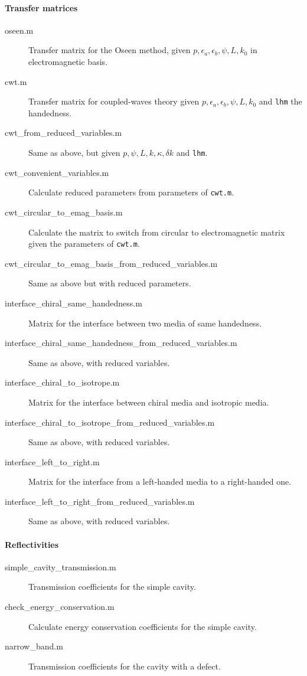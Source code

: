 \paragraph{Transfer matrices}

\begin{description}
	\item[oseen.m] Transfer matrix for the Oseen method, given $p, \epsilon_a, \epsilon_b, \psi, L, k_0$ in electromagnetic basis.
	\item[cwt.m] Transfer matrix for coupled-waves theory given $p, \epsilon_a, \epsilon_b, \psi, L, k_0$ and \verb|lhm| the handedness.
	\item[cwt_from_reduced_variables.m] Same as above, but given $p, \psi, L, k, \kappa, \delta k$ and \verb|lhm|.
	\item[cwt_convenient_variables.m] Calculate reduced parameters from parameters of \verb|cwt.m|.
	\item[cwt_circular_to_emag_basis.m] Calculate the matrix to switch from circular to electromagnetic matrix given the parameters of \verb|cwt.m|.
	\item[cwt_circular_to_emag_basis_from_reduced_variables.m] Same as above but with reduced parameters.
	\item[interface_chiral_same_handedness.m] Matrix for the interface between two media of same handedness.
	\item[interface_chiral_same_handedness_from_reduced_variables.m] Same as above, with reduced variables.
	\item[interface_chiral_to_isotrope.m] Matrix for the interface between chiral media and isotropic media.
	\item[interface_chiral_to_isotrope_from_reduced_variables.m] Same as above, with reduced variables.
	\item[interface_left_to_right.m] Matrix for the interface from a left-handed media to a right-handed one.
	\item[interface_left_to_right_from_reduced_variables.m] Same as above, with reduced variables.
\end{description}

\paragraph{Reflectivities}

\begin{description}
	\item[simple_cavity_transmission.m] Transmission coefficients for the simple cavity.
	\item[check_energy_conservation.m] Calculate energy conservation coefficients for the simple cavity.
	\item[narrow_band.m] Transmission coefficients for the cavity with a defect.
\end{description}

